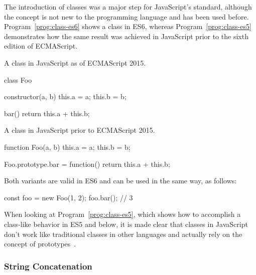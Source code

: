 The introduction of classes was a major step for JavaScript's standard, although the concept is not new to the programming language and has been used before. Program~\ref{prog:class-es6} shows a class in ES6, whereas Program~\ref{prog:class-es5} demonstrates how the same result was achieved in JavaScript prior to the sixth edition of ECMAScript.
\begin{program}
\caption{A class in JavaScript as of ECMAScript 2015.}
\label{prog:class-es6}
\begin{JsCode}
class Foo {
  
  constructor(a, b) {
    this.a = a;
    this.b = b;
  } 
  
  bar() {
    return this.a + this.b;
  }
  
}
\end{JsCode}
\end{program}
\begin{program}
\caption{A class in JavaScript prior to ECMAScript 2015.}
\label{prog:class-es5}
\begin{JsCode}
function Foo(a, b) {
  this.a = a;
  this.b = b;
}

Foo.prototype.bar = function() {
  return this.a + this.b;
}
\end{JsCode}
\end{program}
Both variants are valid in ES6 and can be used in the same way, as follows:
\begin{JsCode}[numbers=none]
const foo = new Foo(1, 2);
foo.bar(); // 3
\end{JsCode}
When looking at Program~\ref{prog:class-es5}, which shows how to accomplish a class-like behavior in ES5 and below, it is made clear that classes in JavaScript don't work like traditional classes in other languages and actually rely on the concept of prototypes~\cite[p.~135]{YDKJS:ES6AndBeyond:Simpson:2015}.

\subsubsection{String Concatenation}

